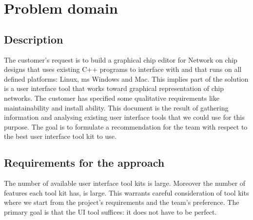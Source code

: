 \section{Problem domain}
\subsection{Description}

The customer's request is to build a graphical chip editor for Network on chip
designs that uses existing C++ programs to interface with and that runs on all
defined platforms: Linux, ms Windows and Mac. This implies part of the solution
is a user interface tool that works toward graphical representation of chip
networks. The customer has specified some qualitative requirements like
maintainability and install ability. This document is the result of gathering
information and analysing existing user interface tools that we could use for
this purpose. The goal is to formulate a recommendation for the team with
respect to the best user interface tool kit to use.

\subsection{Requirements for the approach}

The number of available user interface tool kits is large.  Moreover the number
of features each tool kit has, is large. This warrants careful consideration of
tool kits where we start from the project's requirements and the team's
preference. The primary goal is that the UI tool suffices: it does not have to
be perfect.
